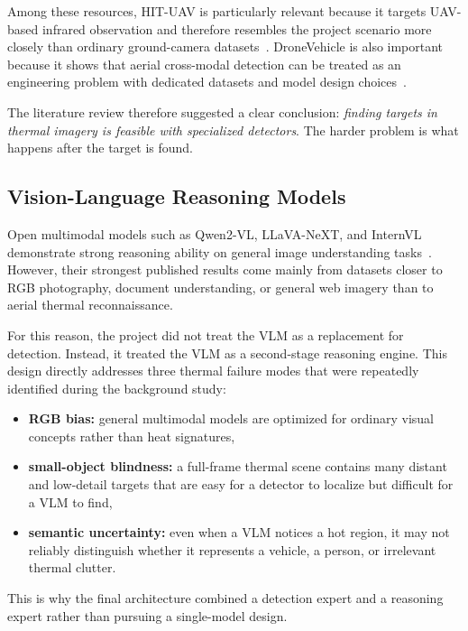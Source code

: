 Among these resources, HIT-UAV is particularly relevant because it targets UAV-based
infrared observation and therefore resembles the project scenario more closely than ordinary
ground-camera datasets~\cite{hituav2022}. DroneVehicle is also important because it shows
that aerial cross-modal detection can be treated as an engineering problem with dedicated
datasets and model design choices~\cite{dronevehicle2022}.

The literature review therefore suggested a clear conclusion: \emph{finding targets in thermal
imagery is feasible with specialized detectors}. The harder problem is what happens after the
target is found.

\subsection{Vision-Language Reasoning Models}

Open multimodal models such as Qwen2-VL, LLaVA-NeXT, and InternVL demonstrate
strong reasoning ability on general image understanding tasks~\cite{qwen2vl,llavanext,
internvl2024}. However, their strongest published results come mainly from datasets closer
to RGB photography, document understanding, or general web imagery than to aerial thermal
reconnaissance.

For this reason, the project did not treat the VLM as a replacement for detection. Instead, it
treated the VLM as a second-stage reasoning engine. This design directly addresses three
thermal failure modes that were repeatedly identified during the background study:

\begin{itemize}[nosep]
  \item \textbf{RGB bias:} general multimodal models are optimized for ordinary visual
    concepts rather than heat signatures,
  \item \textbf{small-object blindness:} a full-frame thermal scene contains many distant and
    low-detail targets that are easy for a detector to localize but difficult for a VLM to find,
  \item \textbf{semantic uncertainty:} even when a VLM notices a hot region, it may not
    reliably distinguish whether it represents a vehicle, a person, or irrelevant thermal clutter.
\end{itemize}

This is why the final architecture combined a detection expert and a reasoning expert rather
than pursuing a single-model design.

